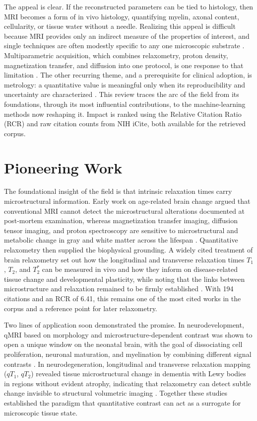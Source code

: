 \documentclass[sn-mathphys,Numbered]{sn-jnl}
\begin{document}
The appeal is clear.
If the reconstructed parameters can be tied to histology, then MRI becomes a form of in vivo histology, quantifying myelin, axonal content, cellularity, or tissue water without a needle.
Realizing this appeal is difficult because MRI provides only an indirect measure of the properties of interest, and single techniques are often modestly specific to any one microscopic substrate \cite{pmid29097317}.
Multiparametric acquisition, which combines relaxometry, proton density, magnetization transfer, and diffusion into one protocol, is one response to that limitation \cite{pmid36040334}.
The other recurring theme, and a prerequisite for clinical adoption, is metrology: a quantitative value is meaningful only when its reproducibility and uncertainty are characterized \cite{pmid33710907}.
This review traces the arc of the field from its foundations, through its most influential contributions, to the machine-learning methods now reshaping it.
Impact is ranked using the Relative Citation Ratio (RCR) and raw citation counts from NIH iCite, both available for the retrieved corpus.

\section{Pioneering Work}\label{sec:pioneers}
The foundational insight of the field is that intrinsic relaxation times carry microstructural information.
Early work on age-related brain change argued that conventional MRI cannot detect the microstructural alterations documented at post-mortem examination, whereas magnetization transfer imaging, diffusion tensor imaging, and proton spectroscopy are sensitive to microstructural and metabolic change in gray and white matter across the lifespan \cite{pmid16041287}.
Quantitative relaxometry then supplied the biophysical grounding.
A widely cited treatment of brain relaxometry set out how the longitudinal and transverse relaxation times $T_1$, $T_2$, and $T_2^{*}$ can be measured in vivo and how they inform on disease-related tissue change and developmental plasticity, while noting that the links between microstructure and relaxation remained to be firmly established \cite{pmid21613875}.
With 194 citations and an RCR of 6.41, this remains one of the most cited works in the corpus and a reference point for later relaxometry.

Two lines of application soon demonstrated the promise.
In neurodevelopment, qMRI based on morphology and microstructure-dependent contrast was shown to open a unique window on the neonatal brain, with the goal of dissociating cell proliferation, neuronal maturation, and myelination by combining different signal contrasts \cite{pmid23872867}.
In neurodegeneration, longitudinal and transverse relaxation mapping ($qT_1$, $qT_2$) revealed tissue microstructural change in dementia with Lewy bodies in regions without evident atrophy, indicating that relaxometry can detect subtle change invisible to structural volumetric imaging \cite{pmid25355453}.
Together these studies established the paradigm that quantitative contrast can act as a surrogate for microscopic tissue state.
\end{document}
